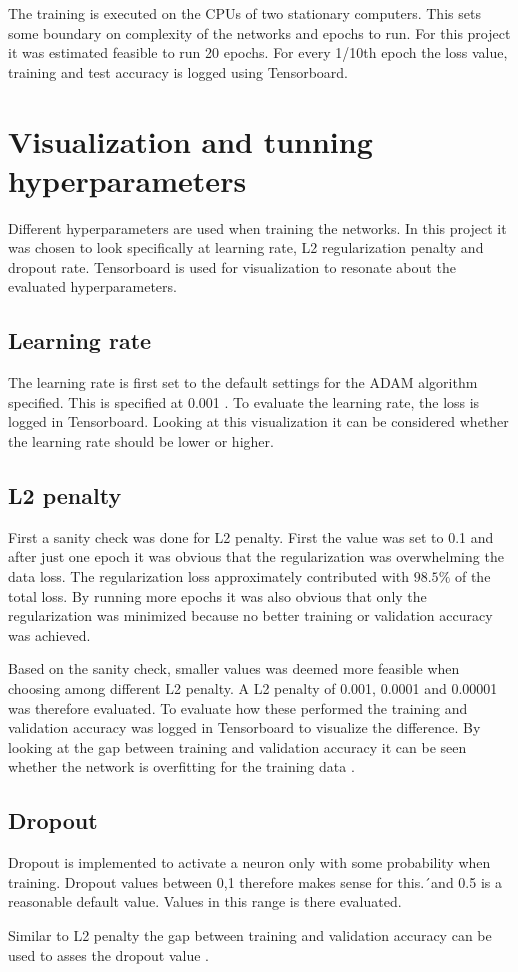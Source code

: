The training is executed on the CPUs of two stationary computers. This sets some boundary on complexity of the networks and epochs to run. For this project it was estimated feasible to run 20 epochs. For every 1/10th epoch the loss value, training and test accuracy is logged using Tensorboard.

\section{Visualization and tunning hyperparameters}
Different hyperparameters are used when training the networks. In this project it was chosen to look specifically at learning rate, L2 regularization penalty and dropout rate. Tensorboard is used for visualization to resonate about the evaluated hyperparameters.

\subsection{Learning rate}
The learning rate is first set to the default settings for the ADAM algorithm specified. This is specified at 0.001 \citep{ADAM}. To evaluate the learning rate, the loss is logged in Tensorboard. Looking at this visualization it can be considered whether the learning rate should be lower or higher.


\subsection{L2 penalty}
First a sanity check was done for L2 penalty. First the value was set to 0.1 and after just one epoch it was obvious that the regularization was overwhelming the data loss. The regularization loss approximately contributed with $98.5\%$ of the total loss. By running more epochs it was also obvious that only the regularization was minimized because no better training or validation accuracy was achieved.

Based on the sanity check, smaller values was deemed more feasible when choosing among different L2 penalty. A L2 penalty of 0.001, 0.0001 and 0.00001 was therefore evaluated. To evaluate how these performed the training and validation accuracy was logged in Tensorboard to visualize the difference. By looking at the gap between training and validation accuracy it can be seen whether the network is overfitting for the training data \citep{NN3}.

\subsection{Dropout}
Dropout is implemented to activate a neuron only with some probability when training. Dropout values between 0,1 therefore makes sense for this.´and 0.5 is a reasonable default value. Values in this range is there evaluated.

Similar to L2 penalty the gap between training and validation accuracy can be used to asses the dropout value \citep{NN3}. 





